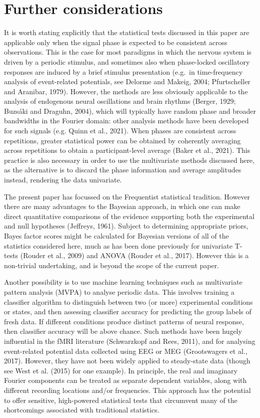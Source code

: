 \documentclass[]{article}
\begin{document}
\hypertarget{further-considerations}{%
\section{Further considerations}\label{further-considerations}}

It is worth stating explicitly that the statistical tests discussed in this paper are applicable only when the signal phase is expected to be consistent across observations. This is the case for most paradigms in which the nervous system is driven by a periodic stimulus, and sometimes also when phase-locked oscillatory responses are induced by a brief stimulus presentation (e.g.~in time-frequency analysis of event-related potentials, see Delorme and Makeig, 2004; Pfurtscheller and Aranibar, 1979). However, the methods are less obviously applicable to the analysis of endogenous neural oscillations and brain rhythms (Berger, 1929; Buzsáki and Draguhn, 2004), which will typically have random phase and broader bandwidths in the Fourier domain: other analysis methods have been developed for such signals (e.g. Quinn et al., 2021). When phases are consistent across repetitions, greater statistical power can be obtained by coherently averaging across repetitions to obtain a participant-level average (Baker et al., 2021). This practice is also necessary in order to use the multivariate methods discussed here, as the alternative is to discard the phase information and average amplitudes instead, rendering the data univariate.

The present paper has focussed on the Frequentist statistical tradition. However there are many advantages to the Bayesian approach, in which one can make direct quantitative comparisons of the evidence supporting both the experimental and null hypotheses (Jeffreys, 1961). Subject to determining appropriate priors, Bayes factor scores might be calculated for Bayesian versions of all of the statistics considered here, much as has been done previously for univariate T-tests (Rouder et al., 2009) and ANOVA (Rouder et al., 2017). However this is a non-trivial undertaking, and is beyond the scope of the current paper.

Another possibility is to use machine learning techniques such as multivariate pattern analysis (MVPA) to analyse periodic data. This involves training a classifier algorithm to distinguish between two (or more) experimental conditions or states, and then assessing classifier accuracy for predicting the group labels of fresh data. If different conditions produce distinct patterns of neural response, then classifier accuracy will be above chance. Such methods have been hugely influential in the fMRI literature (Schwarzkopf and Rees, 2011), and for analysing event-related potential data collected using EEG or MEG (Grootswagers et al., 2017). However, they have not been widely applied to steady-state data (though see West et al. (2015) for one example). In principle, the real and imaginary Fourier components can be treated as separate dependent variables, along with different recording locations and/or frequencies. This approach has the potential to offer sensitive, high-powered statistical tests that circumvent many of the shortcomings associated with traditional statistics.
\end{document}
